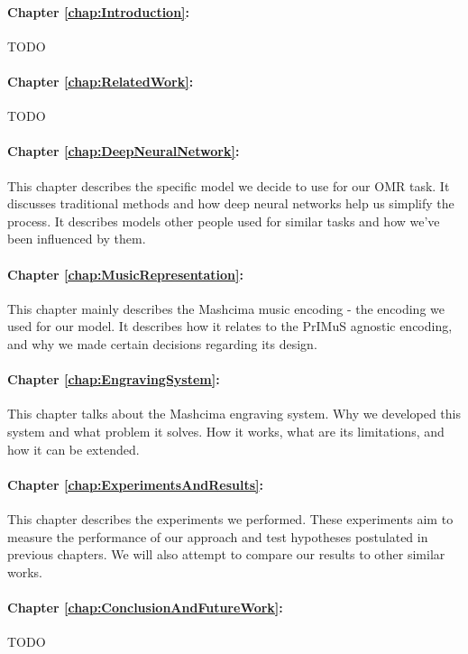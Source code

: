 \paragraph{Chapter \ref{chap:Introduction}:} TODO

\paragraph{Chapter \ref{chap:RelatedWork}:} TODO

\paragraph{Chapter \ref{chap:DeepNeuralNetwork}:} This chapter describes the specific model we decide to use for our OMR task. It discusses traditional methods and how deep neural networks help us simplify the process. It describes models other people used for similar tasks and how we've been influenced by them.

\paragraph{Chapter \ref{chap:MusicRepresentation}:} This chapter mainly describes the Mashcima music encoding - the encoding we used for our model. It describes how it relates to the PrIMuS agnostic encoding, and why we made certain decisions regarding its design.

\paragraph{Chapter \ref{chap:EngravingSystem}:} This chapter talks about the Mashcima engraving system. Why we developed this system and what problem it solves. How it works, what are its limitations, and how it can be extended.

\paragraph{Chapter \ref{chap:ExperimentsAndResults}:} This chapter describes the experiments we performed. These experiments aim to measure the performance of our approach and test hypotheses postulated in previous chapters. We will also attempt to compare our results to other similar works.

\paragraph{Chapter \ref{chap:ConclusionAndFutureWork}:} TODO
